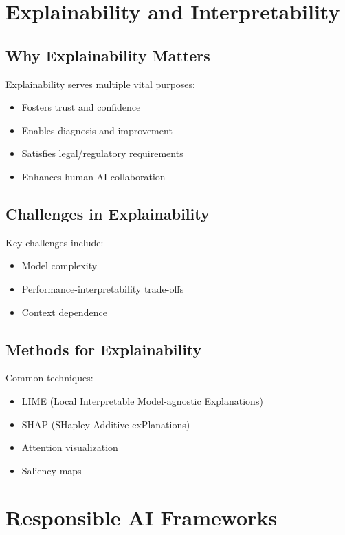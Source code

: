 \documentclass[openany]{book}
\begin{document}
\section{Explainability and Interpretability}

\subsection{Why Explainability Matters}
Explainability serves multiple vital purposes:

\begin{itemize}
    \item Fosters trust and confidence
    \item Enables diagnosis and improvement
    \item Satisfies legal/regulatory requirements
    \item Enhances human-AI collaboration
\end{itemize}

\subsection{Challenges in Explainability}
Key challenges include:

\begin{itemize}
    \item Model complexity
    \item Performance-interpretability trade-offs
    \item Context dependence
\end{itemize}

\subsection{Methods for Explainability}
Common techniques:

\begin{itemize}
    \item LIME (Local Interpretable Model-agnostic Explanations)
    \item SHAP (SHapley Additive exPlanations)
    \item Attention visualization
    \item Saliency maps
\end{itemize}

\section{Responsible AI Frameworks}
\end{document}
